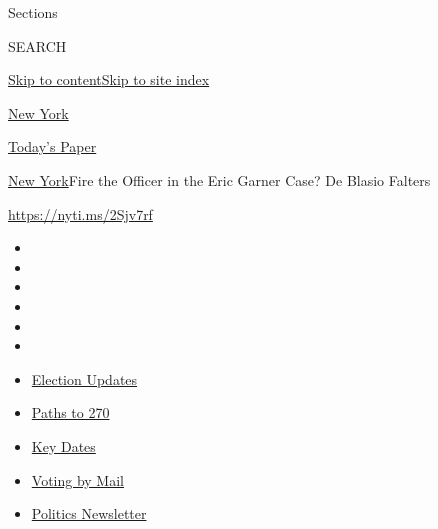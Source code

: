 Sections

SEARCH

\protect\hyperlink{site-content}{Skip to
content}\protect\hyperlink{site-index}{Skip to site index}

\href{https://www.nytimes3xbfgragh.onion/section/nyregion}{New York}

\href{https://myaccount.nytimes3xbfgragh.onion/auth/login?response_type=cookie\&client_id=vi}{}

\href{https://www.nytimes3xbfgragh.onion/section/todayspaper}{Today's
Paper}

\href{/section/nyregion}{New York}\textbar{}Fire the Officer in the Eric
Garner Case? De Blasio Falters

\url{https://nyti.ms/2Sjv7rf}

\begin{itemize}
\item
\item
\item
\item
\item
\item
\end{itemize}

\begin{itemize}
\item
  \href{https://www.nytimes3xbfgragh.onion/live/2020/09/11/us/trump-vs-biden?action=click\&pgtype=Article\&state=default\&region=TOP_BANNER\&context=storylines_menu}{Election
  Updates}
\item
  \href{https://www.nytimes3xbfgragh.onion/interactive/2020/us/elections/election-states-biden-trump.html?action=click\&pgtype=Article\&state=default\&region=TOP_BANNER\&context=storylines_menu}{Paths
  to 270}
\item
  \href{https://www.nytimes3xbfgragh.onion/interactive/2019/us/elections/2020-presidential-election-calendar.html?action=click\&pgtype=Article\&state=default\&region=TOP_BANNER\&context=storylines_menu}{Key
  Dates}
\item
  \href{https://www.nytimes3xbfgragh.onion/interactive/2020/08/31/us/politics/vote-by-mail-deadlines.html?action=click\&pgtype=Article\&state=default\&region=TOP_BANNER\&context=storylines_menu}{Voting
  by Mail}
\item
  \href{https://www.nytimes3xbfgragh.onion/newsletters/politics?action=click\&pgtype=Article\&state=default\&region=TOP_BANNER\&context=storylines_menu}{Politics
  Newsletter}
\end{itemize}

